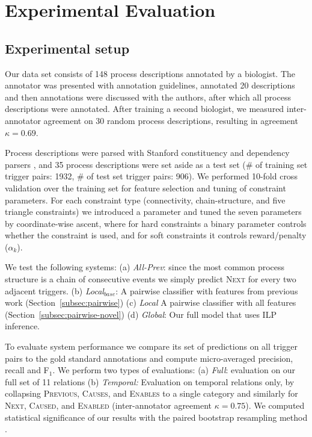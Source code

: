\section{Experimental Evaluation}

\subsection{Experimental setup} \label{subsec:setup}

Our data set consists of 148 process descriptions annotated by a biologist. The annotator was presented with annotation guidelines, annotated 20 descriptions and then annotations were discussed with the authors, after which all process descriptions were annotated. After training a second biologist, we measured inter-annotator agreement on 30 random process descriptions, resulting in agreement $\kappa=0.69$. 

Process descriptions were parsed with Stanford constituency and dependency parsers \cite{Klein03,Marneffe06}, and 35 process descriptions were set aside as a test set (\# of training set trigger pairs: 1932, \# of test set trigger pairs: 906). We performed 10-fold cross validation over the training set for feature selection and tuning of constraint parameters. For each constraint type (connectivity, chain-structure, and five triangle constraints) we introduced a parameter and tuned the seven parameters by coordinate-wise ascent, where for hard constraints a binary parameter controls whether the constraint is used, and for soft constraints it controls reward/penalty ($\alpha_k$).

We test the following systems: (a) \emph{All-Prev}: since the most common process structure is a chain of consecutive events we simply predict \textsc{Next} for every two adjacent triggers. (b) \emph{Local$_{base}$}: A pairwise classifier with features from previous work (Section~\ref{subsec:pairwise}) (c) \emph{Local} A pairwise classifier with all features (Section~\ref{subsec:pairwise-novel}) (d) \emph{Global}: Our full model that uses ILP inference.


To evaluate system performance we compare its set of predictions on all trigger pairs to the gold standard annotations and compute micro-averaged precision, recall and F$_1$. We perform two types of evaluations: (a) \emph{Full}: evaluation on our full set of 11 relations (b) \emph{Temporal:} Evaluation on temporal relations only, by collapsing \textsc{Previous}, \textsc{Causes}, and \textsc{Enables} to a single category and similarly for \textsc{Next}, \textsc{Caused}, and \textsc{Enabled} (inter-annotator agreement $\kappa=0.75$). We computed statistical significance of our results with the paired bootstrap resampling method \cite{efron1993}.

